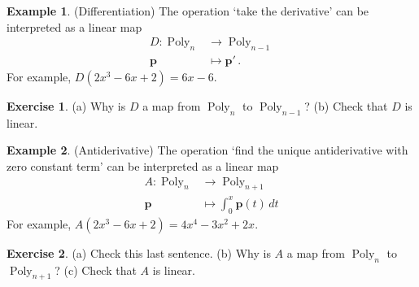 \documentclass[a4paper,11pt]{book}
\theoremstyle{definition}
\newtheorem{exercise}{Exercise}
\newtheorem{example_environment}{Example}[chapter]
\newcommand{\ve}[1]{\mathbf{#1}}
\newenvironment{example}
	{
		\begin{oframed} 
		\begin{example_environment}
	}
	{
		\end{example_environment}
		\end{oframed}
	}
\DeclareMathOperator{\Poly}{Poly}
\begin{document}
\begin{example}(Differentiation) \label{diff_of_poly}The operation `take the derivative' can be interpreted as a linear map
\begin{align*}
 D : \Poly_n & \rightarrow \Poly_{n-1} \\
  \ve{p} & \mapsto \ve{p}' \, .
\end{align*}
For example, $D(2x^3 - 6x + 2) = 6x - 6$.
\begin{exercise} (a) Why is $D$ a map from $\Poly_n$ to $\Poly_{n-1}$? (b) Check that $D$ is linear.
\end{exercise}
\end{example}

\begin{example}(Antiderivative) The operation `find the unique antiderivative with zero constant term' can be interpreted as a linear map
\begin{align*}
 A : \Poly_n & \rightarrow \Poly_{n+1} \\
 \ve{p} & \mapsto \int_0^x \ve{p}(t) \, dt 
\end{align*}
For example, $A(2x^3 - 6x + 2) = 4 x^4 - 3x^2 + 2x$.
\begin{exercise} (a) Check this last sentence. (b) Why is $A$ a map from $\Poly_n$ to $\Poly_{n+1}$? (c) Check that $A$ is linear.
\end{exercise} 
\end{example}
\end{document}
